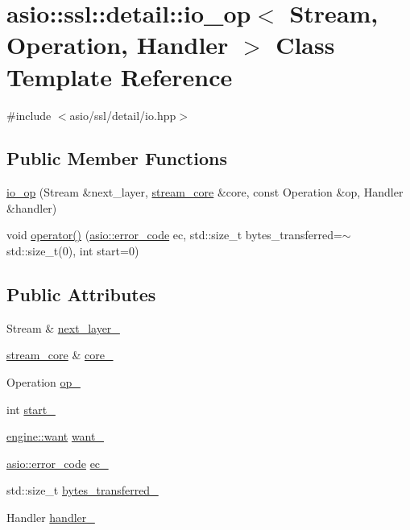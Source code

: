 \hypertarget{classasio_1_1ssl_1_1detail_1_1io__op}{}\section{asio\+:\+:ssl\+:\+:detail\+:\+:io\+\_\+op$<$ Stream, Operation, Handler $>$ Class Template Reference}
\label{classasio_1_1ssl_1_1detail_1_1io__op}


{\ttfamily \#include $<$asio/ssl/detail/io.\+hpp$>$}

\subsection*{Public Member Functions}
\begin{DoxyCompactItemize}
\item 
\hyperlink{classasio_1_1ssl_1_1detail_1_1io__op_a6265a418e64a89feeb031b0eec0c66f7}{io\+\_\+op} (Stream \&next\+\_\+layer, \hyperlink{structasio_1_1ssl_1_1detail_1_1stream__core}{stream\+\_\+core} \&core, const Operation \&op, Handler \&handler)
\item 
void \hyperlink{classasio_1_1ssl_1_1detail_1_1io__op_a23b5b98bcadd08853ff37bfcac72ea35}{operator()} (\hyperlink{classasio_1_1error__code}{asio\+::error\+\_\+code} ec, std\+::size\+\_\+t bytes\+\_\+transferred=$\sim$std\+::size\+\_\+t(0), int start=0)
\end{DoxyCompactItemize}
\subsection*{Public Attributes}
\begin{DoxyCompactItemize}
\item 
Stream \& \hyperlink{classasio_1_1ssl_1_1detail_1_1io__op_ac9a971480ecb8df84bedc0d891172c63}{next\+\_\+layer\+\_\+}
\item 
\hyperlink{structasio_1_1ssl_1_1detail_1_1stream__core}{stream\+\_\+core} \& \hyperlink{classasio_1_1ssl_1_1detail_1_1io__op_a8cfc4ec7786e88fb893239e3afa0d73a}{core\+\_\+}
\item 
Operation \hyperlink{classasio_1_1ssl_1_1detail_1_1io__op_aa3fa2b3e3ad0ee8aa4724a9f1dc9a307}{op\+\_\+}
\item 
int \hyperlink{classasio_1_1ssl_1_1detail_1_1io__op_a447be685fcda22c40259253c5c276543}{start\+\_\+}
\item 
\hyperlink{classasio_1_1ssl_1_1detail_1_1engine_ab9812153941a6a93c9095f4e5ca8f915}{engine\+::want} \hyperlink{classasio_1_1ssl_1_1detail_1_1io__op_a8046c9964a8fd25d82af1c7008c10aed}{want\+\_\+}
\item 
\hyperlink{classasio_1_1error__code}{asio\+::error\+\_\+code} \hyperlink{classasio_1_1ssl_1_1detail_1_1io__op_a3b6a192d0f0e5e3af719212a21f0d221}{ec\+\_\+}
\item 
std\+::size\+\_\+t \hyperlink{classasio_1_1ssl_1_1detail_1_1io__op_a6ae68a9ff5e4002202fcffa1feca8f46}{bytes\+\_\+transferred\+\_\+}
\item 
Handler \hyperlink{classasio_1_1ssl_1_1detail_1_1io__op_a554b84344ad9c6b4d15ac03cc296a2d9}{handler\+\_\+}
\end{DoxyCompactItemize}


